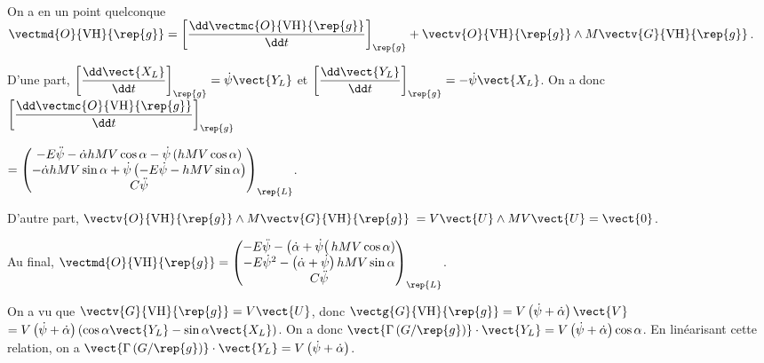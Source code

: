 \ifprof
\begin{corrige} ~\\

On a en un point quelconque
 $\vectmd{O}{\text{VH}}{\rep{g}} =\left[ \dfrac{\dd \vectmc{O}{\text{VH}}{\rep{g}}}{\dd t}\right]_{\rep{g}}+\vectv{O}{\text{VH}}{\rep{g}} \wedge M\vectv{G}{\text{VH}}{\rep{g}}$.
 
 D'une part, $\left[ \dfrac{\dd \vect{X_L} }{\dd t}\right]_{\rep{g}} = \dot{\psi}\vect{Y_L}$ et $\left[ \dfrac{\dd \vect{Y_L} }{\dd t}\right]_{\rep{g}} = -\dot{\psi}\vect{X_L}$. On a donc 
 $\left[ \dfrac{\dd \vectmc{O}{\text{VH}}{\rep{g}}}{\dd t}\right]_{\rep{g}} $ 
 
 $ = 
  \begin{pmatrix} 
  -E\ddot{\psi} - \dot{\alpha} hMV \cos\alpha - \dot{\psi}\left( hMV\cos\alpha\right)\\ 
  -\dot{\alpha} hMV\sin\alpha +\dot{\psi}\left( -E\dot{\psi} -  hMV \sin\alpha\right)\\ 
  C\ddot{\psi} \end{pmatrix}_{\rep{L}} 
  $.
  
  D'autre part, $\vectv{O}{\text{VH}}{\rep{g}} \wedge M\vectv{G}{\text{VH}}{\rep{g}}$ $=V\vect{U}\wedge MV\vect{U} = \vect{0}$.
  
  Au final, $\vectmd{O}{\text{VH}}{\rep{g}} = \begin{pmatrix} 
  -E\ddot{\psi} - \left(\dot{\alpha} + \dot{\psi}\right( hMV\cos\alpha)\\ 
  -E\dot{\psi}^2 -\left(\dot{\alpha} +\dot{\psi}\right)  hMV \sin\alpha\\ 
  C\ddot{\psi} \end{pmatrix}_{\rep{L}} 
  $.

\end{corrige}
\else
\fi
{}
\ifprof
\begin{corrige}
On a vu que $\vectv{G}{\text{VH}}{\rep{g}} = V\vect{U}$, donc  $\vectg{G}{\text{VH}}{\rep{g}} = V\left(\dot{\psi}+\dot{\alpha} \right)\vect{V}$
$= V\left(\dot{\psi}+\dot{\alpha} \right)\left( \cos\alpha \vect{Y_L} - \sin\alpha \vect{X_L} \right)$. 
On a donc  $\vect{\Gamma\left(G/\rep{g} \right)}\cdot \vect{Y_L} = V\left(\dot{\psi}+\dot{\alpha} \right) \cos\alpha  $.
En linéarisant cette relation, on a  $\vect{\Gamma\left(G/\rep{g} \right)}\cdot \vect{Y_L} = V\left(\dot{\psi}+\dot{\alpha} \right)$.

\end{corrige}
\else
\fi


